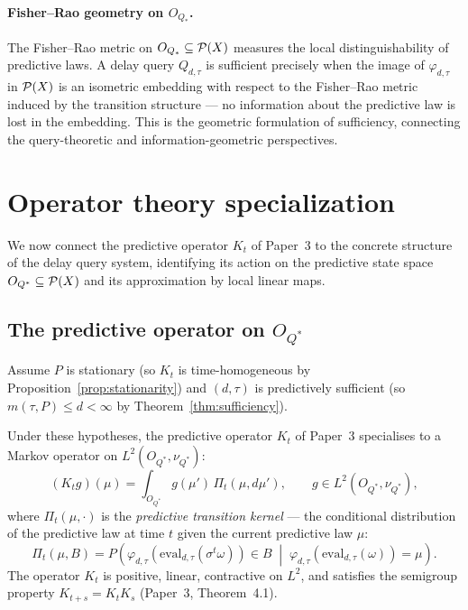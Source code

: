 \paragraph{Fisher--Rao geometry on $O_{Q_*}$.}
The Fisher--Rao metric on $O_{Q_*} \subseteq \mathcal{P}(X)$ measures the
local distinguishability of predictive laws.  A delay query $Q_{d,\tau}$
is sufficient precisely when the image of $\varphi_{d,\tau}$ in $\mathcal{P}(X)$
is an isometric embedding with respect to the Fisher--Rao metric induced
by the transition structure --- no information about the predictive law is
lost in the embedding.  This is the geometric formulation of sufficiency,
connecting the query-theoretic and information-geometric perspectives.

\section{Operator theory specialization}\label{sec:delay-operators}

We now connect the predictive operator $K_t$ of Paper~3 to the concrete
structure of the delay query system, identifying its action on the
predictive state space $O_{Q^*} \subseteq \mathcal{P}(X)$ and its approximation
by local linear maps.

\subsection*{The predictive operator on $O_{Q^*}$}

Assume $P$ is stationary (so $K_t$ is time-homogeneous by
Proposition~\ref{prop:stationarity}) and $(d,\tau)$ is predictively
sufficient (so $m(\tau,P) \leq d < \infty$ by
Theorem~\ref{thm:sufficiency}).

\begin{proposition}\label{prop:kt-delay}
Under these hypotheses, the predictive operator $K_t$ of Paper~3
specialises to a Markov operator on $L^2(O_{Q^*}, \nu_{Q^*})$:
\[
  (K_t g)(\mu) = \int_{O_{Q^*}} g(\mu')\, \Pi_t(\mu, d\mu'),
  \qquad g \in L^2(O_{Q^*}, \nu_{Q^*}),
\]
where $\Pi_t(\mu, \cdot)$ is the \emph{predictive transition kernel} ---
the conditional distribution of the predictive law at time $t$ given the
current predictive law $\mu$:
\[
  \Pi_t(\mu, B) = P\!\left(\varphi_{d,\tau}(\mathrm{eval}_{d,\tau}(\sigma^t\omega)) \in B
  \;\middle|\;
  \varphi_{d,\tau}(\mathrm{eval}_{d,\tau}(\omega)) = \mu\right).
\]
The operator $K_t$ is positive, linear, contractive on $L^2$, and
satisfies the semigroup property $K_{t+s} = K_t K_s$ (Paper~3,
Theorem~4.1).
\end{proposition}

